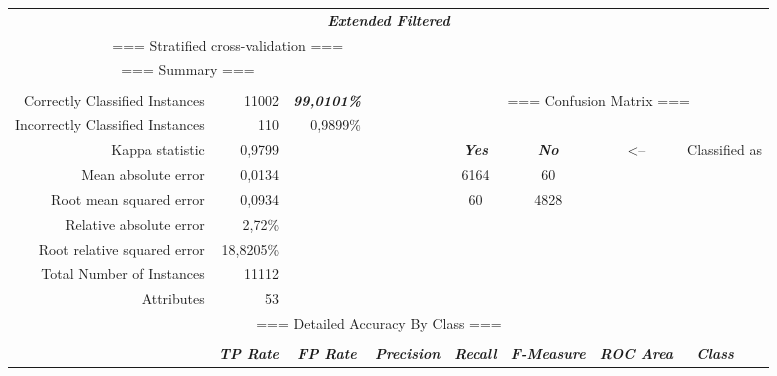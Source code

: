 \begin{table}[htbp]
	\begin{tabular}{rrrrrrrrr}
		\multicolumn{9}{c}{\textit{\textbf{Extended Filtered}}} \\
		\multicolumn{4}{c}{=== Stratified cross-validation ===} &       &       &       &       &  \\
		\multicolumn{3}{c}{=== Summary ===} &       &       &       &       &       &  \\
		&       &       &       &       &       &       &       &  \\
		Correctly Classified Instances    & 11002 & \textit{\textbf{99,0101\%}} &       & \multicolumn{4}{c}{=== Confusion Matrix ===} & \multicolumn{1}{c}{} \\
		Incorrectly Classified Instances & 110   & 0,9899\% &       &       &       &       &       &  \\
		Kappa statistic   & 0,9799 &       &       & \multicolumn{1}{c}{\textit{\textbf{Yes}}} & \multicolumn{1}{c}{\textit{\textbf{No}}} & \multicolumn{1}{c}{<--} & \multicolumn{2}{c}{Classified as} \\
		Mean absolute error & 0,0134 &       &       & \multicolumn{1}{c}{6164} & \multicolumn{1}{c}{60} &       &       &  \\
		Root mean squared error & 0,0934 &       &       & \multicolumn{1}{c}{60} & \multicolumn{1}{c}{4828} &       &       &  \\
		Relative absolute error & 2,72\% &       &       &       &       &       &       &  \\
		Root relative squared error & 18,8205\% &       &       &       &       &       &       &  \\
		Total Number of Instances      & 11112 &       &       &       &       &       &       &  \\
		Attributes & 53    &       &       &       &       &       &       &  \\
		\multicolumn{8}{c}{=== Detailed Accuracy By Class ===}        &  \\
		&       &       &       &       &       &       &       &  \\
		\multicolumn{1}{c}{} & \multicolumn{1}{c}{\textit{\textbf{TP Rate}}} & \multicolumn{1}{c}{\textit{\textbf{FP Rate}}} & \multicolumn{1}{c}{\textit{\textbf{Precision}}} & \multicolumn{1}{c}{\textit{\textbf{Recall}}} & \multicolumn{1}{c}{\textit{\textbf{F-Measure}}} & \multicolumn{1}{c}{\textit{\textbf{ROC Area}}} & \multicolumn{1}{c}{\textit{\textbf{Class}}} &  \\

\end{tabular}
\end{table}
